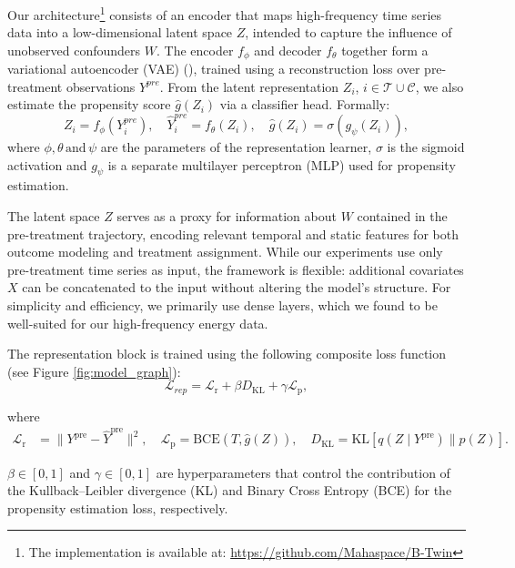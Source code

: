\documentclass[10pt]{article} %
\begin{document}
Our architecture\footnote{The implementation is available at: \url{https://github.com/Mahaspace/B-Twin}}  consists of an encoder that maps high-frequency time series data into a low-dimensional latent space \( Z \), intended to capture the influence of unobserved confounders \( W \). The encoder \( f_\phi \) and decoder \( f_\theta \) together form a variational autoencoder (VAE) (\citealt{kingma2013auto,vaeTS}), trained using a reconstruction loss over pre-treatment observations \(Y^{pre}\). From the latent representation \( Z_i \),  $i \in \mathcal{T}\cup \mathcal{C}$, we also estimate the propensity score \( \hat{g}(Z_i) \) via a classifier head. Formally:
\[
Z_i = f_\phi( Y_i^{pre}), \quad \hat{Y}_i^{pre} = f_\theta(Z_i), \quad \hat{g}(Z_i) = \sigma(g_\psi(Z_i)),
\]
where \(\phi , \theta \,  \text{and} \,\psi\) are the parameters of the representation learner,   \( \sigma \) is the sigmoid activation and \( g_\psi \) is a separate multilayer perceptron (MLP) used for propensity estimation.

The latent space \( Z \) serves as a proxy for information about $W$ contained in the pre-treatment trajectory, encoding relevant temporal and static features for both outcome modeling and treatment assignment. While our experiments use only pre-treatment time series as input, the framework is flexible: additional covariates \(X\) can be concatenated to the input without altering the model's structure. For simplicity and efficiency, we primarily use dense layers, which we found to be well-suited for our high-frequency energy data.

The representation block is trained using the following composite loss function (see Figure \ref{fig:model_graph}):
\[
\mathcal{L}_{rep} = \mathcal{L}_{\text{r}} + \beta D_{\text{KL}} + \gamma \mathcal{L}_{\text{p}},
\]

where
\begin{align*}
\mathcal{L}_{\text{r}} &= \| Y^{\text{pre}} - \hat{Y}^{\text{pre}} \|^2 ,\quad 
\mathcal{L}_{\text{p}} = \text{BCE}(T, \hat{g}(Z)), \quad
D_{\text{KL}} = \text{KL}\left[q(Z \mid   Y^{\text{pre}}) \parallel p(Z)\right].
\end{align*}

\( \beta  \in [0,1]\) and \( \gamma  \in [0,1]\) are hyperparameters that control the contribution of the Kullback--Leibler divergence {(KL)} and Binary Cross Entropy {(BCE)} for the propensity estimation loss, respectively.
\end{document}
